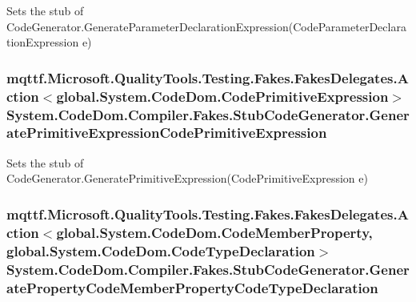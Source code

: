 Sets the stub of Code\-Generator.\-Generate\-Parameter\-Declaration\-Expression(\-Code\-Parameter\-Declaration\-Expression e)

\hypertarget{class_system_1_1_code_dom_1_1_compiler_1_1_fakes_1_1_stub_code_generator_a2190e8bd7d653d6afe2ccba404a0acae}{
\subsubsection[{Generate\-Primitive\-Expression\-Code\-Primitive\-Expression}]{\setlength{\rightskip}{0pt plus 5cm}mqttf.\-Microsoft.\-Quality\-Tools.\-Testing.\-Fakes.\-Fakes\-Delegates.\-Action$<$global.\-System.\-Code\-Dom.\-Code\-Primitive\-Expression$>$ System.\-Code\-Dom.\-Compiler.\-Fakes.\-Stub\-Code\-Generator.\-Generate\-Primitive\-Expression\-Code\-Primitive\-Expression}}\label{class_system_1_1_code_dom_1_1_compiler_1_1_fakes_1_1_stub_code_generator_a2190e8bd7d653d6afe2ccba404a0acae}


Sets the stub of Code\-Generator.\-Generate\-Primitive\-Expression(\-Code\-Primitive\-Expression e)

\hypertarget{class_system_1_1_code_dom_1_1_compiler_1_1_fakes_1_1_stub_code_generator_a2b3239899801b466f114022f50f37b6c}{
\subsubsection[{Generate\-Property\-Code\-Member\-Property\-Code\-Type\-Declaration}]{\setlength{\rightskip}{0pt plus 5cm}mqttf.\-Microsoft.\-Quality\-Tools.\-Testing.\-Fakes.\-Fakes\-Delegates.\-Action$<$global.\-System.\-Code\-Dom.\-Code\-Member\-Property, global.\-System.\-Code\-Dom.\-Code\-Type\-Declaration$>$ System.\-Code\-Dom.\-Compiler.\-Fakes.\-Stub\-Code\-Generator.\-Generate\-Property\-Code\-Member\-Property\-Code\-Type\-Declaration}}\label{class_system_1_1_code_dom_1_1_compiler_1_1_fakes_1_1_stub_code_generator_a2b3239899801b466f114022f50f37b6c}


